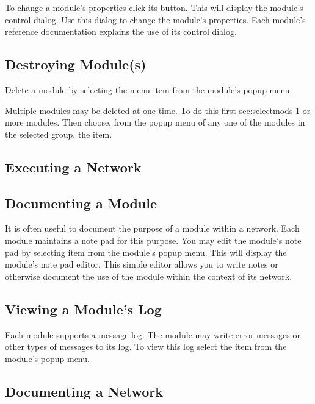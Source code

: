 To change a module's properties click its  button.  This will
display the module's control dialog.  Use this dialog to change the
module's properties.  Each module's reference documentation explains the
use of its control dialog.


\subsection{Destroying Module(s)}
\label{sec:destroymod}

Delete a module by selecting the  menu item from the
module's popup menu.

Multiple modules may be deleted at one time.  To do this first
\hyperref{select}{select (see Section~}{)}{sec:selectmods} 1 or more
modules. Then choose, from the popup menu of any one of the modules in the
selected group, the  item.


\subsection{Executing a Network}
\label{sec:executenet}

\ytbd


\subsection{Documenting a Module}
\label{sec:docmodule}

It is often useful to document the purpose of a module within a network.
Each module maintains a note pad for this purpose.  You may edit the
module's note pad by selecting  item from the module's
popup menu.  This will display the module's note pad editor.  This simple
editor allows you to write notes or otherwise document the use of the
module within the context of its network.

\subsection{Viewing a Module's Log}
\label{sec:viewmodslog}

Each module supports a message log.  The module may write error messages or
other types of messages to its log.  To view this log select the
 item from the module's popup menu.

\subsection{Documenting a Network}
\label{sec:docnetwork}

